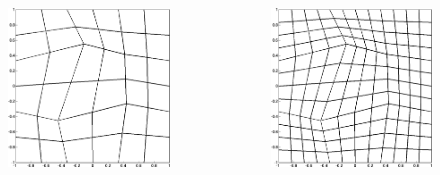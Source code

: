 \documentclass[8pt,xcolor=svgnames]{beamer}
\begin{document}
\begin{frame}
\begin{columns}
\begin{column}{0.6\textwidth}
\begin{columns}
    \begin{column}{0.3\textwidth}
    \begin{figure}[h!]
    \centering
    \includegraphics[width=1.0\textwidth,keepaspectratio=true]{./Images/GradPMesh_h1.png}
    \end{figure}
    \end{column}
    \begin{column}{0.3\textwidth}
    \begin{figure}[h!]
    \centering
    \includegraphics[width=1.0\textwidth,keepaspectratio=true]{./Images/GradPMesh_h2.png}

\end{figure}
\end{column}
\end{columns}
\end{column}
\end{columns}
\end{frame}
\end{document}
